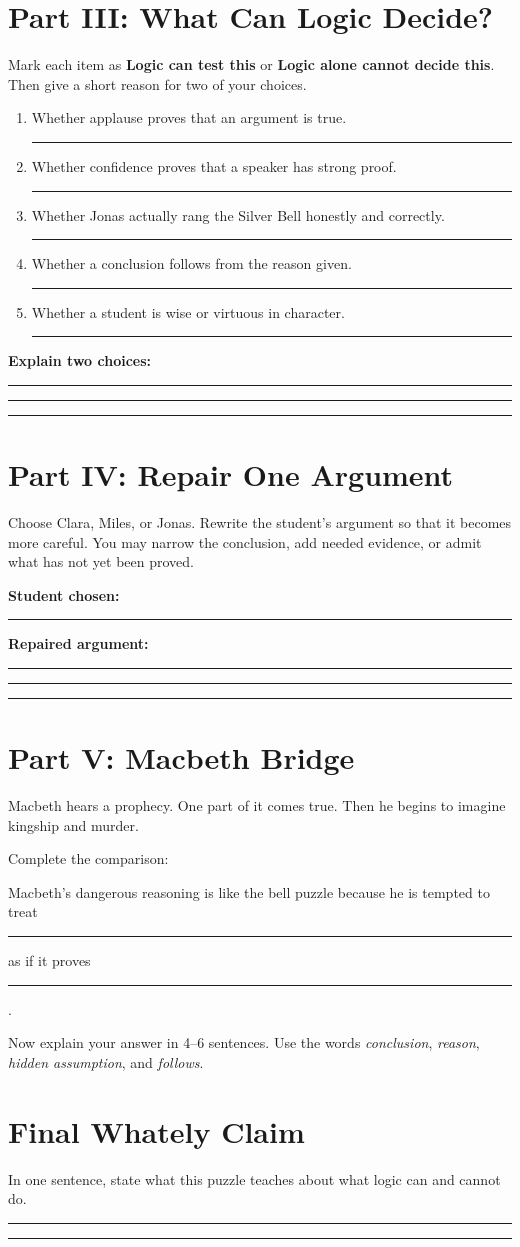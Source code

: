 \documentclass[12pt]{article}
\newcommand{\focusbox}[1]{\par\vspace{0.35em}\noindent\begingroup\setlength{\fboxsep}{6pt}\colorbox{gray!12}{\begin{minipage}{\dimexpr\linewidth-2\fboxsep\relax}#1\end{minipage}}\endgroup\par\vspace{0.45em}}
\newcommand{\studentline}{\par\vspace{0.64em}\hrule\vspace{0.68em}}
\begin{document}
\section*{Part III: What Can Logic Decide?}
Mark each item as \textbf{Logic can test this} or \textbf{Logic alone cannot decide this}. Then give a short reason for two of your choices.

\begin{enumerate}[leftmargin=*]
\item Whether applause proves that an argument is true. \hfill \rule{2.3in}{0.4pt}
\item Whether confidence proves that a speaker has strong proof. \hfill \rule{2.3in}{0.4pt}
\item Whether Jonas actually rang the Silver Bell honestly and correctly. \hfill \rule{2.3in}{0.4pt}
\item Whether a conclusion follows from the reason given. \hfill \rule{2.3in}{0.4pt}
\item Whether a student is wise or virtuous in character. \hfill \rule{2.3in}{0.4pt}
\end{enumerate}

\textbf{Explain two choices:}\studentline\studentline\studentline

\section*{Part IV: Repair One Argument}
Choose Clara, Miles, or Jonas. Rewrite the student's argument so that it becomes more careful. You may narrow the conclusion, add needed evidence, or admit what has not yet been proved.

\textbf{Student chosen:} \rule{1.45in}{0.4pt}

\textbf{Repaired argument:}\studentline\studentline\studentline

\section*{Part V: Macbeth Bridge}
Macbeth hears a prophecy. One part of it comes true. Then he begins to imagine kingship and murder.

Complete the comparison:

\focusbox{Macbeth's dangerous reasoning is like the bell puzzle because he is tempted to treat \rule{1.8in}{0.4pt} as if it proves \rule{1.8in}{0.4pt}.}

Now explain your answer in 4--6 sentences. Use the words \textit{conclusion}, \textit{reason}, \textit{hidden assumption}, and \textit{follows}.

\vspace{1.55in}

\section*{Final Whately Claim}
In one sentence, state what this puzzle teaches about what logic can and cannot do.

\studentline\studentline
\end{document}

